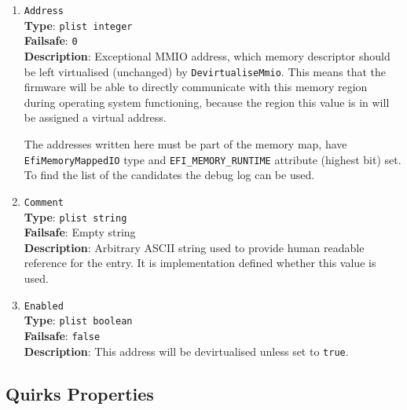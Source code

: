 \documentclass[]{article}
\makeatletter
\renewcommand{\label}[1]{%
\zref@wrapper@immediate{\oldlabel{#1}}}  %
\makeatother
\begin{document}
\begin{enumerate}

\item
  \texttt{Address}\\
  \textbf{Type}: \texttt{plist\ integer}\\
  \textbf{Failsafe}: \texttt{0}\\
  \textbf{Description}: Exceptional MMIO address, which memory descriptor should be left
  virtualised (unchanged) by \texttt{DevirtualiseMmio}. This means that the firmware will
  be able to directly communicate with this memory region during operating system functioning,
  because the region this value is in will be assigned a virtual address.

  The addresses written here must be part of the memory map, have \texttt{EfiMemoryMappedIO}
  type and \texttt{EFI\_MEMORY\_RUNTIME} attribute (highest bit) set. To find the list of the
  candidates the debug log can be used.

\item
  \texttt{Comment}\\
  \textbf{Type}: \texttt{plist\ string}\\
  \textbf{Failsafe}: Empty string\\
  \textbf{Description}: Arbitrary ASCII string used to provide human readable
  reference for the entry. It is implementation defined whether this value is
  used.

\item
  \texttt{Enabled}\\
  \textbf{Type}: \texttt{plist\ boolean}\\
  \textbf{Failsafe}: \texttt{false}\\
  \textbf{Description}: This address will be devirtualised unless set to \texttt{true}.

\end{enumerate}

\subsection{Quirks Properties}\label{booterpropsquirks}
\end{document}
